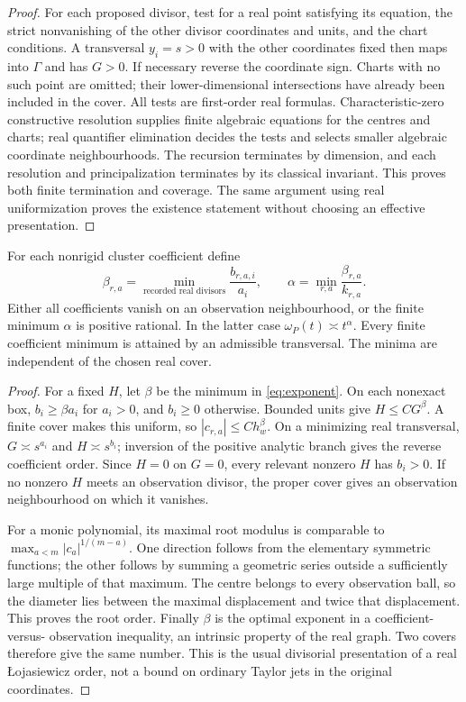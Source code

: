 \begin{proof}
For each proposed divisor, test for a real point satisfying its equation,
the strict nonvanishing of the other divisor coordinates and units, and
the chart conditions. A transversal $y_i=s>0$ with the other coordinates
fixed then maps into $\Gamma$ and has $G>0$. If necessary reverse the
coordinate sign. Charts with no such point are omitted; their
lower-dimensional intersections have already been included in the cover.
All tests are first-order real formulas. Characteristic-zero constructive
resolution supplies finite algebraic equations for the centres and
charts; real quantifier elimination decides the tests and selects smaller
algebraic coordinate neighbourhoods. The recursion terminates by dimension,
and each resolution and principalization terminates by its classical
invariant. This proves both finite termination and coverage. The same
argument using real uniformization \cite{BM88} proves the existence
statement without choosing an effective presentation.
\end{proof}

\begin{corollary}\label{cor:orders}
For each nonrigid cluster coefficient define
\begin{equation}\label{eq:exponent}
 \beta_{r,a}=\min_{\text{recorded real divisors}}\frac{b_{r,a,i}}{a_i},
 \qquad \alpha=\min_{r,a}\frac{\beta_{r,a}}{k_{r,a}}.
\end{equation}
Either all coefficients vanish on an observation neighbourhood, or the
finite minimum $\alpha$ is positive rational. In the latter case
$\omega_P(t)\asymp t^\alpha$. Every finite coefficient minimum is
attained by an admissible transversal. The minima are independent of
the chosen real cover.
\end{corollary}
\begin{proof}
For a fixed $H$, let $\beta$ be the minimum in \eqref{eq:exponent}.
On each nonexact box, $b_i\ge\beta a_i$ for $a_i>0$, and $b_i\ge0$
otherwise. Bounded units give $H\le C G^\beta$. A finite cover makes
this uniform, so $|c_{r,a}|\le C h_w^\beta$. On a minimizing real
transversal, $G\asymp s^{a_i}$ and $H\asymp s^{b_i}$; inversion of
the positive analytic branch gives the reverse coefficient order.
Since $H=0$ on $G=0$, every relevant nonzero $H$ has $b_i>0$.
If no nonzero $H$ meets an observation divisor, the proper cover gives
an observation neighbourhood on which it vanishes.

For a monic polynomial, its maximal root modulus is comparable to
$\max_{a<m}|c_a|^{1/(m-a)}$. One direction follows from the elementary
symmetric functions; the other follows by summing a geometric series
outside a sufficiently large multiple of that maximum. The centre
belongs to every observation ball, so the diameter lies between the
maximal displacement and twice that displacement. This proves the root
order. Finally $\beta$ is the optimal exponent in a coefficient-versus-
observation inequality, an intrinsic property of the real graph. Two
covers therefore give the same number. This is the usual divisorial
presentation of a real \L{}ojasiewicz order, not a bound on ordinary
Taylor jets in the original coordinates.
\end{proof}

